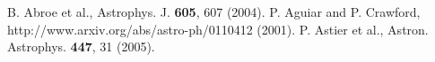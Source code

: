
 B. Abroe et al., Astrophys. J. \textbf{605}, 607 (2004).
 P. Aguiar and P. Crawford, http://www.arxiv.org/abs/astro-ph/0110412 (2001).
 P. Astier et al., Astron. Astrophys. \textbf{447}, 31 (2005).

